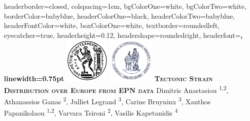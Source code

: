 \documentclass[landscape,a0paper,fontscale=0.340]{baposter} %
\begin{document}
\begin{poster}
{
headerborder=closed, %
colspacing=1em, %
bgColorOne=white, %
bgColorTwo=white, %
borderColor=babyblue, %
headerColorOne=black, %
headerColorTwo=babyblue, %
headerFontColor=white, %
boxColorOne=white, %
textborder=roundedleft, %
eyecatcher=true, %
headerheight=0.12\textheight, %
headershape=roundedright, %
headerfont=\Large\bf\textsc, %
linewidth=0.75pt %
}
%
{\includegraphics[height=6em]{../../logos/ntua.png} \includegraphics[height=6em]{../../logos/noa1.png}} %
{\bf\textsc{Tectonic Strain Distribution over Europe from EPN data}\vspace{0.3em} } %
{\large Dimitris Anastasiou \textsuperscript{1,2}, Athanassios Ganas \textsuperscript{2}, Julliet Legrand \textsuperscript{3}, Carine Bruyninx \textsuperscript{3}, Xanthos Papanikolaou \textsuperscript{1,2}, Varvara Tsironi \textsuperscript{2}, Vasilis Kapetanidis \textsuperscript{4} 
}
\end{poster}
\end{document}
